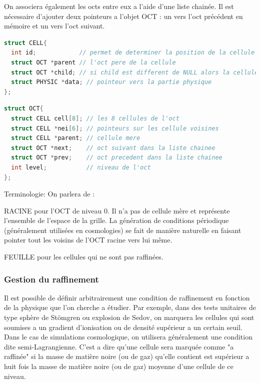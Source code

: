On associera également les octs entre eux a l'aide d'une liste chainée. 
Il est nécessaire d'ajouter deux pointeurs a l'objet OCT : un vers l'oct précédent en mémoire et un vers l'oct suivant.

\begin{lstlisting}[float=bth,language=C,frame=tb,caption={les structures cellule de EMMA},label=lst:cell]
struct CELL{
  int id;            // permet de determiner la position de la cellule dans l'oct
  struct OCT *parent // l'oct pere de la cellule
  struct OCT *child; // si child est different de NULL alors la cellule est raffinee et child point vers l'oct enfant
  struct PHYSIC *data; // pointeur vers la partie physique
};
\end{lstlisting}

\begin{lstlisting}[float=bth,language=C,frame=tb,caption={les structures OCT  de EMMA},label=lst:oct]
struct OCT{
  struct CELL cell[8]; // les 8 cellules de l'oct
  struct CELL *nei[6]; // pointeurs sur les cellule voisines
  struct CELL *parent; // cellule mere
  struct OCT *next;    // oct suivant dans la liste chainee
  struct OCT *prev;    // oct precedent dans la liste chainee
  int level;           // niveau de l'oct
};
\end{lstlisting}


Terminologie:
On parlera de :

RACINE pour l'OCT de niveau 0. Il n'a pas de cellule mère et représente l'ensemble de l'espace de la grille.
La génération de conditions périodique (généralement utilisées en cosmologies) se fait de manière naturelle en faisant pointer tout les voisins de l'OCT racine vers lui même.


FEUILLE pour les cellules qui ne sont pas raffinées. 



\subsubsection{Gestion du raffinement}
\label{sec:raffinement}

Il est possible de définir arbitrairement une condition de raffinement en fonction de la physique que l'on cherche a étudier.
Par exemple, dans des tests unitaires de type sphère de Stömgren ou explosion de Sedov, on marquera les cellules qui sont soumises a un gradient d'ionisation ou de densité supérieur a un certain seuil.
Dans le cas de simulations cosmologique, on utilisera généralement une condition dite semi-Lagrangienne.
C'est a dire qu'une cellule sera marquée comme "a raffinée" si la masse de matière noire (ou de gaz) qu'elle contient est supérieur a huit fois la masse de matière noire (ou de gaz) moyenne d'une cellule de ce niveau.



